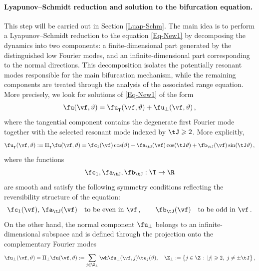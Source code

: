 \documentclass[a4paper,reqno,10pt]{article}
\begin{document}
\paragraph{Lyapunov--Schmidt reduction and solution to the bifurcation equation.}
This step will be carried out in Section \ref{Luap-Schm}. The main idea is to perform a Lyapunov–Schmidt reduction to the equation \eqref{Eq-New1} by decomposing the dynamics into two components: a finite-dimensional part generated by the distinguished low Fourier modes, and an infinite-dimensional part corresponding to the normal directions. This decomposition isolates the potentially resonant modes responsible for the main bifurcation mechanism, while the remaining components are treated through the analysis of the associated range equation.
More precisely, we look for solutions of \eqref{Eq-New1} of the form
\begin{equation*}
	\fu(\vf,\vartheta)
	=
	\fu_{\intercal}(\vf,\vartheta)
	+
	\fu_{\perp}(\vf,\vartheta)\,,
\end{equation*}
where the tangential component contains the degenerate first Fourier mode together with the selected resonant mode indexed by $\tJ\geqslant2$. More explicitly,
\begin{equation*}
	\fu_{\intercal}(\vf,\vartheta)
	:=\Pi_{\intercal}\fu(\vf,\vartheta)=
	\fc_{1}(\vf)\cos(\vartheta)
	+
	\fa_{\tJ}(\vf)\cos(\tJ\vartheta)
	+
	\fb_{\tJ}(\vf)\sin(\tJ\vartheta)\,,
\end{equation*}
where the functions 
\[
\fc_{1},\fa_{\tJ},\fb_{\tJ}:\T\to\R
\]
are smooth and satisfy the following  symmetry conditions  reflecting the reversibility structure of the
equation:
\begin{equation*}
\fc_{1}(\vf), \, \fa_{\tJ}(\vf)\quad \text{to be even in } \vf\,,
\qquad
\fb_{\tJ}(\vf)\quad \text{to be odd in } \vf\,.
\end{equation*}
On the other hand, the normal component $\fu_{\perp}$  belongs to an infinite-dimensional  subspace and is defined through the projection onto the complementary Fourier modes
\begin{equation*}
	\fu_{\perp}(\vf,\vartheta)
	=
	\Pi_{\perp}\fu(\vf,\vartheta)
	:=
	\sum_{j\in\Z_{\perp}}
	\wh\fu_{\perp}(\vf,j)\te_j(\vartheta),\quad \Z_{\perp}:=\big\{j\in\Z \,:\,  |j|\geqslant 2, \ j\neq\pm \tJ  \big\}\,,
\end{equation*}
\end{document}
